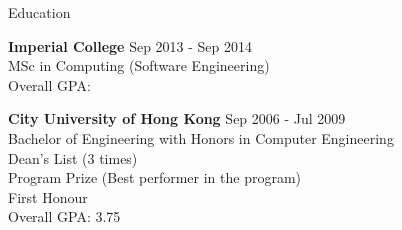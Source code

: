 \documentclass{resume} %
\begin{document}

\begin{rSection}{Education}

{\bf Imperial College} \hfill {Sep 2013 - Sep 2014} \\ 
MSc in Computing (Software Engineering) \\
Overall GPA: 

{\bf City University of Hong Kong} \hfill {Sep 2006 - Jul 2009} \\ 
Bachelor of Engineering with Honors in Computer Engineering \\
Dean’s List (3 times) \\
Program Prize (Best performer in the program)  \\
First Honour\\
Overall GPA: 3.75

\end{rSection}

\end{document}
